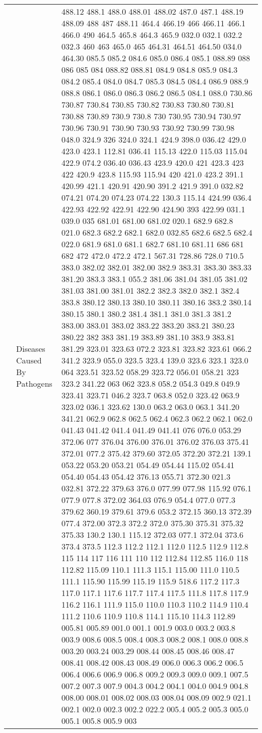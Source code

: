 \begin{longtable}{|R{.05in}|L{.65in}||L{5.65in}|}
    & Diseases Caused By Pathogens &  488.12 488.1 488.0 488.01 488.02 487.0 487.1 488.19 488.09 488 487 488.11 464.4 466.19 466 466.11 466.1 466.0 490 464.5 465.8 464.3 465.9 032.0 032.1 032.2 032.3 460 463 465.0 465 464.31 464.51 464.50 034.0 464.30 085.5 085.2 084.6 085.0 086.4 085.1 088.89 088 086 085 084 088.82 088.81 084.9 084.8 085.9 084.3 084.2 085.4 084.0 084.7 085.3 084.5 084.4 086.9 088.9 088.8 086.1 086.0 086.3 086.2 086.5 084.1 088.0 730.86 730.87 730.84 730.85 730.82 730.83 730.80 730.81 730.88 730.89 730.9 730.8 730 730.95 730.94 730.97 730.96 730.91 730.90 730.93 730.92 730.99 730.98 048.0 324.9 326 324.0 324.1 424.9 398.0 036.42 429.0 423.0 423.1 112.81 036.41 115.13 422.0 115.03 115.04 422.9 074.2 036.40 036.43 423.9 420.0 421 423.3 423 422 420.9 423.8 115.93 115.94 420 421.0 423.2 391.1 420.99 421.1 420.91 420.90 391.2 421.9 391.0 032.82 074.21 074.20 074.23 074.22 130.3 115.14 424.99 036.4 422.93 422.92 422.91 422.90 424.90 393 422.99 031.1 039.0 035 681.01 681.00 681.02 020.1 682.9 682.8 021.0 682.3 682.2 682.1 682.0 032.85 682.6 682.5 682.4 022.0 681.9 681.0 681.1 682.7 681.10 681.11 686 681 682 472 472.0 472.2 472.1 567.31 728.86 728.0 710.5 383.0 382.02 382.01 382.00 382.9 383.31 383.30 383.33 381.20 383.3 383.1 055.2 381.06 381.04 381.05 381.02 381.03 381.00 381.01 382.2 382.3 382.0 382.1 382.4 383.8 380.12 380.13 380.10 380.11 380.16 383.2 380.14 380.15 380.1 380.2 381.4 381.1 381.0 381.3 381.2 383.00 383.01 383.02 383.22 383.20 383.21 380.23 380.22 382 383 381.19 383.89 381.10 383.9 383.81 381.29 323.01 323.63 072.2 323.81 323.82 323.61 066.2 341.2 323.9 055.0 323.5 323.4 139.0 323.6 323.1 323.0 064 323.51 323.52 058.29 323.72 056.01 058.21 323 323.2 341.22 063 062 323.8 058.2 054.3 049.8 049.9 323.41 323.71 046.2 323.7 063.8 052.0 323.42 063.9 323.02 036.1 323.62 130.0 063.2 063.0 063.1 341.20 341.21 062.9 062.8 062.5 062.4 062.3 062.2 062.1 062.0 041.43 041.42 041.4 041.49 041.41 076 076.0 053.29 372.06 077 376.04 376.00 376.01 376.02 376.03 375.41 372.01 077.2 375.42 379.60 372.05 372.20 372.21 139.1 053.22 053.20 053.21 054.49 054.44 115.02 054.41 054.40 054.43 054.42 376.13 055.71 372.30 021.3 032.81 372.22 379.63 376.0 077.99 077.98 115.92 076.1 077.9 077.8 372.02 364.03 076.9 054.4 077.0 077.3 379.62 360.19 379.61 379.6 053.2 372.15 360.13 372.39 077.4 372.00 372.3 372.2 372.0 375.30 375.31 375.32 375.33 130.2 130.1 115.12 372.03 077.1 372.04 373.6 373.4 373.5 112.3 112.2 112.1 112.0 112.5 112.9 112.8 115 114 117 116 111 110 112 112.84 112.85 116.0 118 112.82 115.09 110.1 111.3 115.1 115.00 111.0 110.5 111.1 115.90 115.99 115.19 115.9 518.6 117.2 117.3 117.0 117.1 117.6 117.7 117.4 117.5 111.8 117.8 117.9 116.2 116.1 111.9 115.0 110.0 110.3 110.2 114.9 110.4 111.2 110.6 110.9 110.8 114.1 115.10 114.3 112.89 005.81 005.89 001.0 001.1 001.9 003.0 003.2 003.8 003.9 008.6 008.5 008.4 008.3 008.2 008.1 008.0 008.8 003.20 003.24 003.29 008.44 008.45 008.46 008.47 008.41 008.42 008.43 008.49 006.0 006.3 006.2 006.5 006.4 006.6 006.9 006.8 009.2 009.3 009.0 009.1 007.5 007.2 007.3 007.9 004.3 004.2 004.1 004.0 004.9 004.8 008.00 008.01 008.02 008.03 008.04 008.09 002.9 021.1 002.1 002.0 002.3 002.2 022.2 005.4 005.2 005.3 005.0 005.1 005.8 005.9 003 
\end{longtable}
